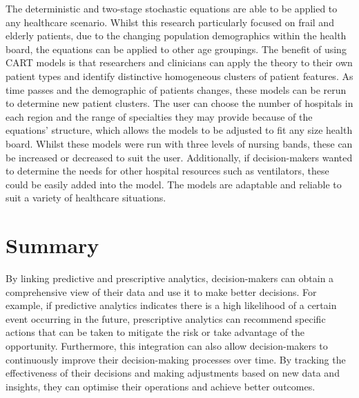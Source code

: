 \documentclass[../thesis.tex]{subfiles}
\begin{document}
The deterministic and two-stage stochastic equations are able to be applied to any healthcare scenario. Whilst this research particularly focused on frail and elderly patients, due to the changing population demographics within the health board, the equations can be applied to other age groupings. The benefit of using CART models is that researchers and clinicians can apply the theory to their own patient types and identify distinctive homogeneous clusters of patient features. As time passes and the demographic of patients changes, these models can be rerun to determine new patient clusters. The user can choose the number of hospitals in each region and the range of specialties they may provide because of the equations' structure, which allows the models to be adjusted to fit any size health board. Whilst these models were run with three levels of nursing bands, these can be increased or decreased to suit the user. Additionally, if decision-makers wanted to determine the needs for other hospital resources such as ventilators, these could be easily added into the model. The models are adaptable and reliable to suit a variety of healthcare situations.


\section{Summary}
By linking predictive and prescriptive analytics, decision-makers can obtain a comprehensive view of their data and use it to make better decisions. For example, if predictive analytics indicates there is a high likelihood of a certain event occurring in the future, prescriptive analytics can recommend specific actions that can be taken to mitigate the risk or take advantage of the opportunity. Furthermore, this integration can also allow decision-makers to continuously improve their decision-making processes over time. By tracking the effectiveness of their decisions and making adjustments based on new data and insights, they can optimise their operations and achieve better outcomes.
\end{document}
